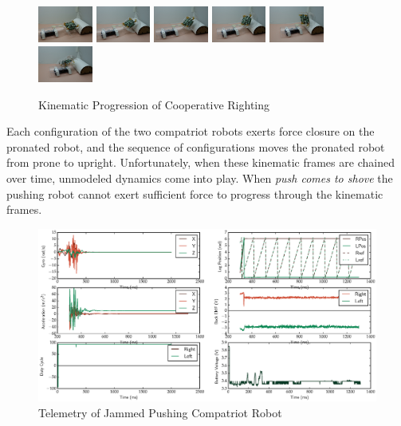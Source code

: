 \documentclass[letterpaper]{report}
\begin{document}
\begin{figure}[ht]
  \centering
  \includegraphics[width=0.16\textwidth]{KinPanel0.jpg}
  \includegraphics[width=0.16\textwidth]{KinPanel1.jpg}
  \includegraphics[width=0.16\textwidth]{KinPanel2.jpg}
  \includegraphics[width=0.16\textwidth]{KinPanel3.jpg}
  \includegraphics[width=0.16\textwidth]{KinPanel5.jpg}
  \includegraphics[width=0.16\textwidth]{KinPanel6.jpg}
  \caption{\label{fig:KinematicFlipRealLife}Kinematic Progression of Cooperative Righting}
\end{figure}

Each configuration of the two compatriot robots exerts force closure on the pronated robot, and the sequence of configurations moves the pronated robot from prone to upright.
Unfortunately, when these kinematic frames are chained over time, unmodeled dynamics come into play.
When \textit{push comes to shove} the pushing robot cannot exert sufficient force to progress through the kinematic frames.

\begin{figure}[ht]
  \centering
  \includegraphics[width=\textwidth]{JammedTelemetry.eps}
  \caption{\label{fig:JammedKinFlipTelemetry}Telemetry of Jammed Pushing Compatriot Robot}
\end{figure}
\end{document}
